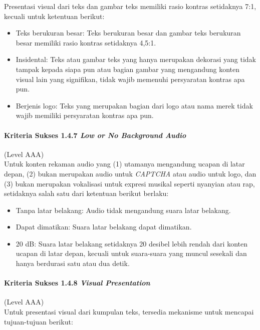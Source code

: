 Presentasi visual dari teks dan gambar teks memiliki rasio kontras setidaknya 7:1, kecuali untuk ketentuan berikut:

\begin{itemize}
	\item Teks berukuran besar: Teks berukuran besar dan gambar teks berukuran besar memiliki rasio kontras setidaknya 4,5:1.
	\item Insidental: Teks atau gambar teks yang hanya merupakan dekorasi yang tidak tampak kepada siapa pun atau bagian gambar yang mengandung konten visual lain yang signifikan, tidak wajib memenuhi persyaratan kontras apa pun.
	\item Berjenis logo: Teks yang merupakan bagian dari logo atau nama merek tidak wajib memiliki persyaratan kontras apa pun.
\end{itemize}

\paragraph{Kriteria Sukses 1.4.7 \textit{Low or No Background Audio}}
\label{sec:kriteria_sukses_1.4.7}
(Level AAA)\\

Untuk konten rekaman audio yang (1) utamanya mengandung ucapan di latar depan, (2) bukan merupakan audio untuk \textit{CAPTCHA} atau audio untuk logo, dan (3) bukan merupakan vokalisasi untuk expresi musikal seperti nyanyian atau rap, setidaknya salah satu dari ketentuan berikut berlaku:

\begin{itemize}
	\item Tanpa latar belakang: Audio tidak mengandung suara latar belakang.
	\item Dapat dimatikan: Suara latar belakang dapat dimatikan.
	\item 20 dB: Suara latar belakang setidaknya 20 desibel lebih rendah dari konten ucapan di latar depan, kecuali untuk suara-suara yang muncul sesekali dan hanya berdurasi satu atau dua detik.
\end{itemize}

\paragraph{Kriteria Sukses 1.4.8 \textit{Visual Presentation}}
\label{sec:kriteria_sukses_1.4.8}
(Level AAA)\\

Untuk presentasi visual dari kumpulan teks, tersedia mekanisme untuk mencapai tujuan-tujuan berikut:

